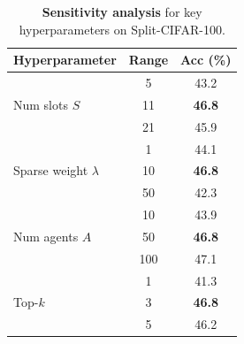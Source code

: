 \documentclass{article}
\begin{document}
\begin{table}[h]
\centering
\caption{\textbf{Sensitivity analysis} for key hyperparameters on Split-CIFAR-100.}
\label{tab:sensitivity}
\vspace{0.5em}
\begin{tabular}{lcc}
\toprule
\textbf{Hyperparameter} & \textbf{Range} & \textbf{Acc (\%)} \\
\midrule
\multirow{3}{*}{Num slots $S$} & 5 & 43.2 \\
& 11 & \textbf{46.8} \\
& 21 & 45.9 \\
\midrule
\multirow{3}{*}{Sparse weight $\lambda$} & 1 & 44.1 \\
& 10 & \textbf{46.8} \\
& 50 & 42.3 \\
\midrule
\multirow{3}{*}{Num agents $A$} & 10 & 43.9 \\
& 50 & \textbf{46.8} \\
& 100 & 47.1 \\
\midrule
\multirow{3}{*}{Top-$k$} & 1 & 41.3 \\
& 3 & \textbf{46.8} \\
& 5 & 46.2 \\
\bottomrule
\end{tabular}
\end{table}
\end{document}
